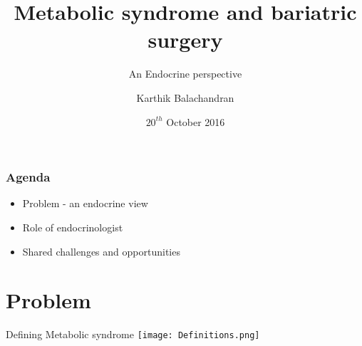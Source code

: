 \documentclass[11pt]{beamer}
\author{Karthik Balachandran}
\title{Metabolic syndrome and bariatric surgery}
\subtitle{An Endocrine perspective}
\date{$20^{th}$ October 2016}
\begin{document}
	\maketitle
	
	\begin{frame}
		\frametitle{Agenda}
\begin{itemize}
  \item Problem - an endocrine view
  \item Role of endocrinologist
  \item Shared challenges and opportunities
\end{itemize}
	\end{frame}

\section{Problem}
\begin{frame}{Defining Metabolic syndrome }
\texttt{[image: Definitions.png]}
\end{frame}	

{
\begin{frame}[plain]
\end{frame}
} 

{
\begin{frame}[plain]
\end{frame}
} 
\end{document}
